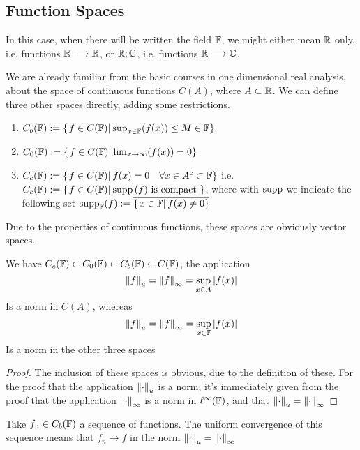 \documentclass[../complete.tex]{subfiles}
\begin{document}
\subsection{Function Spaces}
\begin{ntn}
	In this case, when there will be written the field $\mathbb{F}$, we might either mean $\mathbb{R}$ only, i.e. functions $\mathbb{R}\overset{}{\longrightarrow}\mathbb{R}$, or $\mathbb{R};\mathbb{C}$, i.e. functions $\mathbb{R}\overset{}{\longrightarrow}\mathbb{C}$.
\end{ntn}
\begin{dfn}
	We are already familiar from the basic courses in one dimensional real analysis, about the space of continuous functions $C(A)$, where $A\subset\mathbb{R}$. We can define three other spaces directly, adding some restrictions.
	\begin{enumerate}
	\item $C_b(\mathbb{F}):=\{\left.f\in C(\mathbb{F})\right|_{}\sup_{x\in\mathbb{F}}(f(x))\le M\in\mathbb{F}\}$
	\item $C_0(\mathbb{F}):=\{\left.f\in C(\mathbb{F})\right|_{}\lim_{x\to\infty}(f(x))=0\}$
	\item $C_c(\mathbb{F}):=\{\left.f\in C(\mathbb{F})\right|_{}f(x)=0\quad\forall x\in A^{\mathrm{c}}\subset\mathbb{F}\}$ i.e. $C_c(\mathbb{F}):=\{\left.f\in C(\mathbb{F})\right|_{}\operatorname{supp}{(f)}\text{ is compact }\}$, where with $\operatorname{supp}$ we indicate the following set $\operatorname{supp}_{\mathbb{F}}(f):=\overline{\{\left.x\in\mathbb{F}\right|_{}f(x)\ne 0\}}$
	\end{enumerate}
\end{dfn}
Due to the properties of continuous functions, these spaces are obviously vector spaces.
\begin{prop}
	We have $C_c(\mathbb{F})\subset C_0(\mathbb{F})\subset C_b(\mathbb{F})\subset C(\mathbb{F})$, the application
	\begin{equation}
		\norm{f}_u=\norm{f}_\infty=\sup_{x\in A}\abs{f(x)}
		\label{eq:unormf}
	\end{equation}
	Is a norm in $C(A)$, whereas
	\begin{equation}
		\norm{f}_u=\norm{f}_\infty=\sup_{x\in\mathbb{F}}\abs{f(x)}
		\label{eq:unormf2}
	\end{equation}
	Is a norm in the other three spaces
\end{prop}
\begin{proof}
	The inclusion of these spaces is obvious, due to the definition of these. For the proof that the application $\norm{\cdot}_u$ is a norm, it's immediately given from the proof that the application $\norm{\cdot}_\infty$ is a norm in $\ell^\infty(\mathbb{F})$, and that $\norm{\cdot}_u=\norm{\cdot}_\infty$
\end{proof}
\begin{rmk}
	Take $f_n\in C_b(\mathbb{F})$ a sequence of functions. The uniform convergence of this sequence means that $f_n\to f$ in the norm $\norm{\cdot}_u=\norm{\cdot}_\infty$
\end{rmk}
\end{document}
